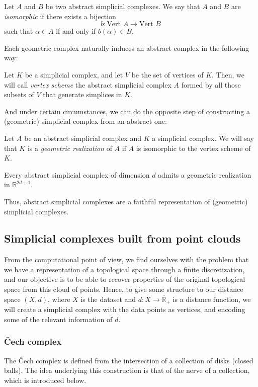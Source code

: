 \documentclass[../main.tex]{subfiles}
\begin{document}
\begin{definition}
Let $A$ and $B$ be two abstract simplicial complexes. We say that $A$ and $B$ are \emph{isomorphic} if there exists a bijection \[b:\text{Vert }A \to \text{Vert }B\] such that $\alpha \in A$ if and only if $b(\alpha) \in B$.
\end{definition}

Each geometric complex naturally induces an abstract complex in the following way:
\begin{definition}
Let $K$ be a simplicial complex, and let $V$ be the set of vertices of $K$. Then, we will call \emph{vertex scheme} the abstract simplicial complex $A$ formed by all those subsets of $V$ that generate simplices in $K$.
\end{definition}

And under certain circumstances, we can do the opposite step of constructing a (geometric) simplicial complex from an abstract one:
\begin{definition}
Let $A$ be an abstract simplicial complex and $K$ a simplicial complex. We will say that $K$ is a \emph{geometric realization} of $A$ if $A$ is isomorphic to the vertex scheme of $K$.
\end{definition}

\begin{theorem}
Every abstract simplicial complex of dimension $d$ admits a geometric realization in $\mathbb{R}^{2d + 1}$.
\end{theorem}

Thus, abstract simplicial complexes are a faithful representation of (geometric) simplicial complexes.

\subsection{Simplicial complexes built from point clouds}
From the computational point of view, we find ourselves with the problem that we have a representation of a topological space through a finite discretization, and our objective is to be able to recover properties of the original topological space from this cloud of points. Hence, to give some structure to our distance space $(X,d)$, where $X$ is the dataset and $d: X \to \overline{\mathbb{R}}_+$ is a distance function, we will create a simplicial complex with the data points as vertices, and encoding some of the relevant information of $d$.

\subsubsection*{\v{C}ech complex}
The \v{C}ech complex is defined from the intersection of a collection of disks (closed balls). The idea underlying this construction is that of the nerve of a collection, which is introduced below.
\end{document}
